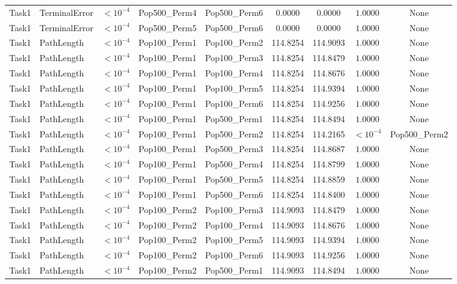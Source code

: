 \documentclass[8pt]{article}
\begin{document}
\begin{longtable}{llccccccc}
Task1 & TerminalError & $< 10^{-4}$ & Pop500\_Perm4 & Pop500\_Perm6 & 0.0000 & 0.0000 & $1.0000$ & None \\
Task1 & TerminalError & $< 10^{-4}$ & Pop500\_Perm5 & Pop500\_Perm6 & 0.0000 & 0.0000 & $1.0000$ & None \\
Task1 & PathLength & $< 10^{-4}$ & Pop100\_Perm1 & Pop100\_Perm2 & 114.8254 & 114.9093 & $1.0000$ & None \\
Task1 & PathLength & $< 10^{-4}$ & Pop100\_Perm1 & Pop100\_Perm3 & 114.8254 & 114.8479 & $1.0000$ & None \\
Task1 & PathLength & $< 10^{-4}$ & Pop100\_Perm1 & Pop100\_Perm4 & 114.8254 & 114.8676 & $1.0000$ & None \\
Task1 & PathLength & $< 10^{-4}$ & Pop100\_Perm1 & Pop100\_Perm5 & 114.8254 & 114.9394 & $1.0000$ & None \\
Task1 & PathLength & $< 10^{-4}$ & Pop100\_Perm1 & Pop100\_Perm6 & 114.8254 & 114.9256 & $1.0000$ & None \\
Task1 & PathLength & $< 10^{-4}$ & Pop100\_Perm1 & Pop500\_Perm1 & 114.8254 & 114.8494 & $1.0000$ & None \\
Task1 & PathLength & $< 10^{-4}$ & Pop100\_Perm1 & Pop500\_Perm2 & 114.8254 & 114.2165 & $< 10^{-4}$ & Pop500\_Perm2 \\
Task1 & PathLength & $< 10^{-4}$ & Pop100\_Perm1 & Pop500\_Perm3 & 114.8254 & 114.8687 & $1.0000$ & None \\
Task1 & PathLength & $< 10^{-4}$ & Pop100\_Perm1 & Pop500\_Perm4 & 114.8254 & 114.8799 & $1.0000$ & None \\
Task1 & PathLength & $< 10^{-4}$ & Pop100\_Perm1 & Pop500\_Perm5 & 114.8254 & 114.8859 & $1.0000$ & None \\
Task1 & PathLength & $< 10^{-4}$ & Pop100\_Perm1 & Pop500\_Perm6 & 114.8254 & 114.8400 & $1.0000$ & None \\
Task1 & PathLength & $< 10^{-4}$ & Pop100\_Perm2 & Pop100\_Perm3 & 114.9093 & 114.8479 & $1.0000$ & None \\
Task1 & PathLength & $< 10^{-4}$ & Pop100\_Perm2 & Pop100\_Perm4 & 114.9093 & 114.8676 & $1.0000$ & None \\
Task1 & PathLength & $< 10^{-4}$ & Pop100\_Perm2 & Pop100\_Perm5 & 114.9093 & 114.9394 & $1.0000$ & None \\
Task1 & PathLength & $< 10^{-4}$ & Pop100\_Perm2 & Pop100\_Perm6 & 114.9093 & 114.9256 & $1.0000$ & None \\
Task1 & PathLength & $< 10^{-4}$ & Pop100\_Perm2 & Pop500\_Perm1 & 114.9093 & 114.8494 & $1.0000$ & None \\

\end{longtable}
\end{document}
